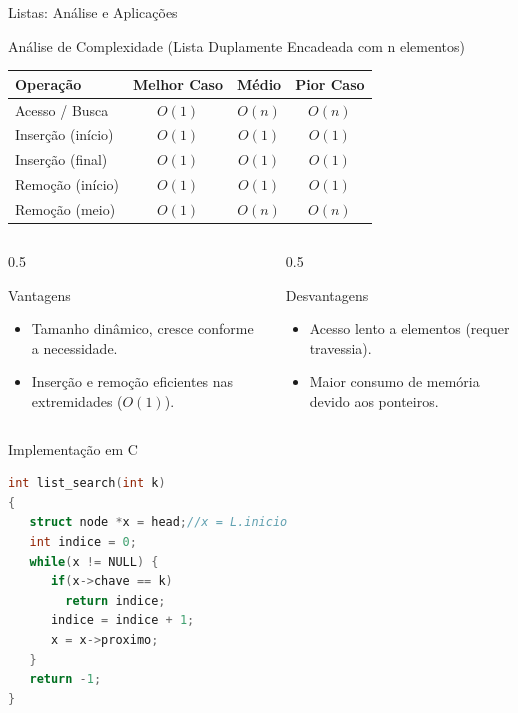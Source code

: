 \documentclass{beamer}
\begin{document}
\begin{frame}{Listas: Análise e Aplicações}
\footnotesize
\begin{block}{Análise de Complexidade (Lista Duplamente Encadeada com n elementos)}
    \centering
    \begin{tabular}{l c c c}
    \hline
    \textbf{Operação} & \textbf{Melhor Caso} & \textbf{Médio} & \textbf{Pior Caso} \\
    \hline
    Acesso / Busca   & $O(1)$ & $O(n)$ & $O(n)$ \\
    Inserção (início) & $O(1)$ & $O(1)$ & $O(1)$ \\
    Inserção (final)\* & $O(1)$ & $O(1)$ & $O(1)$ \\
    Remoção (início)  & $O(1)$ & $O(1)$ & $O(1)$ \\
    Remoção (meio)\*\* & $O(1)$ & $O(n)$ & $O(n)$ \\
    \hline
    \end{tabular}

\end{block}

\begin{columns}[T]
    \begin{column}{0.5\textwidth}
        \begin{alertblock}{Vantagens}
            \begin{itemize}
                \item Tamanho dinâmico, cresce conforme a necessidade.
                \item Inserção e remoção eficientes nas extremidades ($O(1)$).
            \end{itemize}
        \end{alertblock}
    \end{column}
    \begin{column}{0.5\textwidth}
        \begin{exampleblock}{Desvantagens}
            \begin{itemize}
                \item Acesso lento a elementos (requer travessia).
                \item Maior consumo de memória devido aos ponteiros.
            \end{itemize}
        \end{exampleblock}
    \end{column}
\end{columns}
\end{frame}


\begin{frame}[fragile]{Implementação em C}

\centering\footnotesize
\begin{lstlisting}[language=C]
int list_search(int k)
{
   struct node *x = head;//x = L.inicio
   int indice = 0;
   while(x != NULL) {
      if(x->chave == k)
        return indice;
      indice = indice + 1;
      x = x->proximo;
   }
   return -1;
}
\end{lstlisting}
\end{frame}
\end{document}
